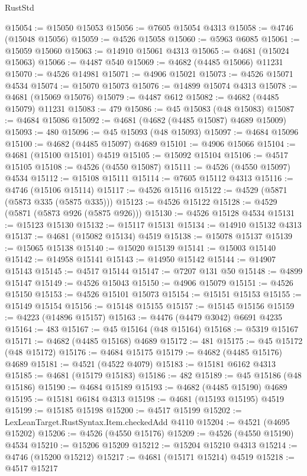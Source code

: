 \begin{lexlean}{RustStd}
\begin{coremodule}
@15054 := @15050 @15053
@15056 := @7605 @15054 @4313
@15058 := @4746 (@15048 @15056)
@15059 := @4526 @15058
@15060 := @5963 @6085
@15061 := @15059 @15060
@15063 := @14910 @15061 @4313
@15065 := @4681 (@15024 @15063)
@15066 := @4487 @540
@15069 := @4682 (@4485 @15066) @11231
@15070 := @4526 @14981
@15071 := @4906 @15021
@15073 := @4526 @15071 @4534
@15074 := @15070 @15073
@15076 := @14899 @15074 @4313
@15078 := @4681 (@15069 @15076)
@15079 := @4487 @612
@15082 := @4682 (@4485 @15079) @11231
@15083 := 479
@15086 := @45 @15083 (@48 @15083)
@15087 := @4684 @15086
@15092 := @4681 (@4682 (@4485 @15087) @4689 @15009)
@15093 := 480
@15096 := @45 @15093 (@48 @15093)
@15097 := @4684 @15096
@15100 := @4682 (@4485 @15097) @4689
@15101 := @4906 @15066
@15104 := @4681 (@15100 @15101) @4519
@15105 := @15092 @15104
@15106 := @4517 @15105
@15108 := @4526 (@4550 @15087)
@15111 := @4526 (@4550 @15097) @4534
@15112 := @15108 @15111
@15114 := @7605 @15112 @4313
@15116 := @4746 (@15106 @15114)
@15117 := @4526 @15116
@15122 := @4529 (@5871 (@5873 @335 (@5875 @335)))
@15123 := @4526 @15122
@15128 := @4529 (@5871 (@5873 @926 (@5875 @926)))
@15130 := @4526 @15128 @4534
@15131 := @15123 @15130
@15132 := @15117 @15131
@15134 := @14910 @15132 @4313
@15137 := @4681 (@15082 @15134) @4519
@15138 := @15078 @15137
@15139 := @15065 @15138
@15140 := @15020 @15139
@15141 := @15003 @15140
@15142 := @14958 @15141
@15143 := @14950 @15142
@15144 := @14907 @15143
@15145 := @4517 @15144
@15147 := @7207 @131 @50
@15148 := @4899 @15147
@15149 := @4526 @15043
@15150 := @4906 @15079
@15151 := @4526 @15150
@15153 := @4526 @15101 @15073
@15154 := @15151 @15153
@15155 := @15149 @15154
@15156 := @15148 @15155
@15157 := @15145 @15156
@15159 := @4223 (@14896 @15157)
@15163 := @4476 (@4479 @3042) @6691 @4235
@15164 := 483
@15167 := @45 @15164 (@48 @15164)
@15168 := @5319 @15167
@15171 := @4682 (@4485 @15168) @4689
@15172 := 481
@15175 := @45 @15172 (@48 @15172)
@15176 := @4684 @15175
@15179 := @4682 (@4485 @15176) @4689
@15181 := @4521 (@4522 @4079)
@15183 := @15181 @6162 @4313
@15185 := @4681 (@15179 @15183)
@15186 := 482
@15189 := @45 @15186 (@48 @15186)
@15190 := @4684 @15189
@15193 := @4682 (@4485 @15190) @4689
@15195 := @15181 @6184 @4313
@15198 := @4681 (@15193 @15195) @4519
@15199 := @15185 @15198
@15200 := @4517 @15199
@15202 := LexLeanTarget.RustSyntax.Item.checkedAdd @4110
@15204 := @4521 (@4695 @15202)
@15206 := @4526 (@4550 @15176)
@15209 := @4526 (@4550 @15190) @4534
@15210 := @15206 @15209
@15212 := @15204 @15210 @4313
@15214 := @4746 (@15200 @15212)
@15217 := @4681 (@15171 @15214) @4519
@15218 := @4517 @15217

\end{coremodule}
\end{lexlean}
